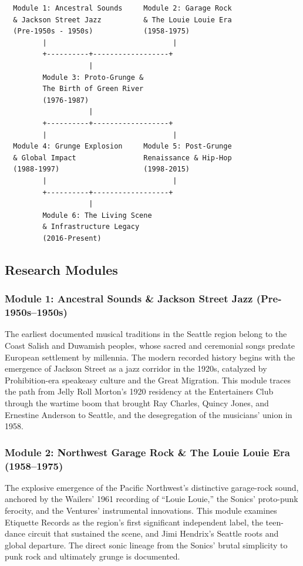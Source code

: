 \documentclass[11pt,letterpaper]{article}
\begin{document}
\begin{asciibox}
\begin{verbatim}
  Module 1: Ancestral Sounds     Module 2: Garage Rock
  & Jackson Street Jazz          & The Louie Louie Era
  (Pre-1950s - 1950s)            (1958-1975)
         |                              |
         +----------+------------------+
                    |
         Module 3: Proto-Grunge &
         The Birth of Green River
         (1976-1987)
                    |
         +----------+------------------+
         |                              |
  Module 4: Grunge Explosion     Module 5: Post-Grunge
  & Global Impact                Renaissance & Hip-Hop
  (1988-1997)                    (1998-2015)
         |                              |
         +----------+------------------+
                    |
         Module 6: The Living Scene
         & Infrastructure Legacy
         (2016-Present)
\end{verbatim}
\end{asciibox}

\subsection{Research Modules}

\subsubsection{Module 1: Ancestral Sounds \& Jackson Street Jazz (Pre-1950s--1950s)}
The earliest documented musical traditions in the Seattle region belong to the Coast Salish and Duwamish peoples, whose sacred and ceremonial songs predate European settlement by millennia. The modern recorded history begins with the emergence of Jackson Street as a jazz corridor in the 1920s, catalyzed by Prohibition-era speakeasy culture and the Great Migration. This module traces the path from Jelly Roll Morton's 1920 residency at the Entertainers Club through the wartime boom that brought Ray Charles, Quincy Jones, and Ernestine Anderson to Seattle, and the desegregation of the musicians' union in 1958.

\subsubsection{Module 2: Northwest Garage Rock \& The Louie Louie Era (1958--1975)}
The explosive emergence of the Pacific Northwest's distinctive garage-rock sound, anchored by the Wailers' 1961 recording of ``Louie Louie,'' the Sonics' proto-punk ferocity, and the Ventures' instrumental innovations. This module examines Etiquette Records as the region's first significant independent label, the teen-dance circuit that sustained the scene, and Jimi Hendrix's Seattle roots and global departure. The direct sonic lineage from the Sonics' brutal simplicity to punk rock and ultimately grunge is documented.
\end{document}
